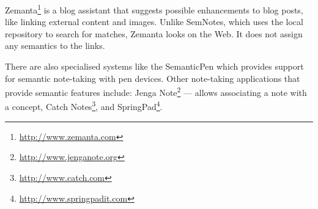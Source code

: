 Zemanta\footnote{\url{http://www.zemanta.com}} is a blog assistant that suggests possible enhancements to blog posts, like linking external content and images. Unlike SemNotes, which uses the local repository to search for matches, Zemanta looks on the Web. It does not assign any semantics to the links. 

There are also specialised systems like the SemanticPen \cite{Varadarajan2005} which provides support for semantic note-taking with pen devices.
Other note-taking applications that provide semantic features include: Jenga Note\footnote{\url{http://www.jenganote.org}} --- allows associating a note with a concept, Catch Notes\footnote{\url{http://www.catch.com}}, and SpringPad\footnote{\url{http://www.springpadit.com}}.
